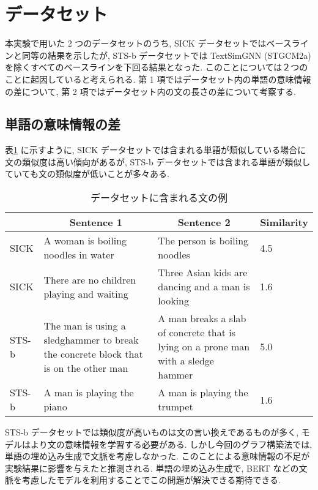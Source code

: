 \documentclass[a4j,twoside,12pt]{thesis} %
\begin{document}
\section{データセット}
本実験で用いた 2 つのデータセットのうち, SICK データセットではベースラインと同等の結果を示したが, STS-b データセットでは TextSimGNN (STGCM2a) を除くすべてのベースラインを下回る結果となった.
このことについては２つのことに起因していると考えられる. 第 1 項ではデータセット内の単語の意味情報の差について, 第 2 項ではデータセット内の文の長さの差について考察する.

\subsection{単語の意味情報の差}
表\ref{table:SICKSTS} に示すように, SICK データセットでは含まれる単語が類似している場合に文の類似度は高い傾向があるが, STS-b データセットでは含まれる単語が類似していても文の類似度が低いことが多々ある.
\begin{table}
  \caption{データセットに含まれる文の例}
  \label{table:SICKSTS}
  \begin{center}
  \begin{tabularx}{\linewidth}{l||X|X|X}
    \hline
          & \multicolumn{1}{c|}{Sentence 1} & \multicolumn{1}{c|}{Sentence 2} & \multicolumn{1}{c}{Similarity}  \\
    \hline
    \hline
    SICK &
    A woman is boiling noodles in water &
    The person is boiling noodles &
    4.5\\
    \hline
    SICK &
    There are no children playing and waiting &
    Three Asian kids are dancing and a man is looking &
    1.6\\
    \hline
    STS-b &
    The man is using a sledghammer to break the concrete block that is on the other man &
    A man breaks a slab of concrete that is lying on a prone man with a sledge hammer &
    5.0 \\
    \hline
    STS-b &
    A man is playing the piano &
    A man is playing the trumpet &
    1.6\\
    \hline
  \end{tabularx}
  \end{center}
\end{table}

STS-b データセットでは類似度が高いものは文の言い換えであるものが多く, モデルはより文の意味情報を学習する必要がある. しかし今回のグラフ構築法では, 単語の埋め込み生成で文脈を考慮しなかった. このことによる意味情報の不足が実験結果に影響を与えたと推測される. 単語の埋め込み生成で, BERT などの文脈を考慮したモデルを利用することでこの問題が解決できる期待できる.
\end{document}
